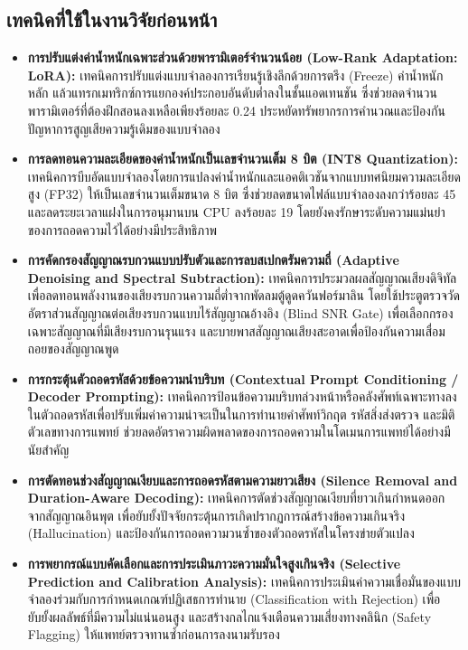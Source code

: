 \subsection{เทคนิคที่ใช้ในงานวิจัยก่อนหน้า}
\begin{itemize}
    \item \textbf{การปรับแต่งค่าน้ำหนักเฉพาะส่วนด้วยพารามิเตอร์จำนวนน้อย (Low-Rank Adaptation: LoRA):} เทคนิคการปรับแต่งแบบจำลองการเรียนรู้เชิงลึกด้วยการตรึง (Freeze) ค่าน้ำหนักหลัก แล้วแทรกเมทริกซ์การแยกองค์ประกอบอันดับต่ำลงในชั้นแอดเทนชัน ซึ่งช่วยลดจำนวนพารามิเตอร์ที่ต้องฝึกสอนลงเหลือเพียงร้อยละ 0.24 ประหยัดทรัพยากรการคำนวณและป้องกันปัญหาการสูญเสียความรู้เดิมของแบบจำลอง \cite{hu2021lora, thu2026mymediwhisper}
    \item \textbf{การลดทอนความละเอียดของค่าน้ำหนักเป็นเลขจำนวนเต็ม 8 บิต (INT8 Quantization):} เทคนิคการบีบอัดแบบจำลองโดยการแปลงค่าน้ำหนักและแอคติเวชันจากแบบทศนิยมความละเอียดสูง (FP32) ให้เป็นเลขจำนวนเต็มขนาด 8 บิต ซึ่งช่วยลดขนาดไฟล์แบบจำลองลงกว่าร้อยละ 45 และลดระยะเวลาแฝงในการอนุมานบน CPU ลงร้อยละ 19 โดยยังคงรักษาระดับความแม่นยำของการถอดความไว้ได้อย่างมีประสิทธิภาพ \cite{jacob2018quantization, andreyev2025quantization}
    \item \textbf{การคัดกรองสัญญาณรบกวนแบบปรับตัวและการลบสเปกตรัมความถี่ (Adaptive Denoising and Spectral Subtraction):} เทคนิคการประมวลผลสัญญาณเสียงดิจิทัลเพื่อลดทอนพลังงานของเสียงรบกวนความถี่ต่ำจากพัดลมตู้ดูดควันฟอร์มาลิน โดยใช้ประตูตรวจวัดอัตราส่วนสัญญาณต่อเสียงรบกวนแบบไร้สัญญาณอ้างอิง (Blind SNR Gate) เพื่อเลือกกรองเฉพาะสัญญาณที่มีเสียงรบกวนรุนแรง และบายพาสสัญญาณเสียงสะอาดเพื่อป้องกันความเสื่อมถอยของสัญญาณพูด \cite{boll1979suppression, youden1950index}
    \item \textbf{การกระตุ้นตัวถอดรหัสด้วยข้อความนำบริบท (Contextual Prompt Conditioning / Decoder Prompting):} เทคนิคการป้อนข้อความบริบทล่วงหน้าหรือคลังศัพท์เฉพาะทางลงในตัวถอดรหัสเพื่อปรับเพิ่มค่าความน่าจะเป็นในการทำนายคำศัพท์วิกฤต รหัสสิ่งส่งตรวจ และมิติตัวเลขทางการแพทย์ ช่วยลดอัตราความผิดพลาดของการถอดความในโดเมนการแพทย์ได้อย่างมีนัยสำคัญ \cite{radford2023whisper, lin2026automatic}
    \item \textbf{การตัดทอนช่วงสัญญาณเงียบและการถอดรหัสตามความยาวเสียง (Silence Removal and Duration-Aware Decoding):} เทคนิคการตัดช่วงสัญญาณเงียบที่ยาวเกินกำหนดออกจากสัญญาณอินพุต เพื่อยับยั้งปัจจัยกระตุ้นการเกิดปรากฏการณ์สร้างข้อความเกินจริง (Hallucination) และป้องกันการถอดความวนซ้ำของตัวถอดรหัสในโครงข่ายตัวแปลง \cite{koenecke2024careless}
    \item \textbf{การพยากรณ์แบบคัดเลือกและการประเมินภาวะความมั่นใจสูงเกินจริง (Selective Prediction and Calibration Analysis):} เทคนิคการประเมินค่าความเชื่อมั่นของแบบจำลองร่วมกับการกำหนดเกณฑ์ปฏิเสธการทำนาย (Classification with Rejection) เพื่อยับยั้งผลลัพธ์ที่มีความไม่แน่นอนสูง และสร้างกลไกแจ้งเตือนความเสี่ยงทางคลินิก (Safety Flagging) ให้แพทย์ตรวจทานซ้ำก่อนการลงนามรับรอง \cite{geifman2017selective, guo2017calibration}

\end{itemize}
